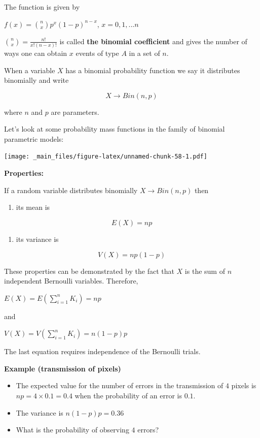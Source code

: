 \documentclass[
]{book}
\providecommand{\tightlist}{%
  \setlength{\itemsep}{0pt}\setlength{\parskip}{0pt}}
\begin{document}
The function is given by

\(f(x)=\binom n x p^x(1-p)^{n-x}\), \(x=0,1,...n\)

\(\binom n x= \frac{n!}{x!(n-x)!}\) is called \textbf{the binomial coefficient} and gives the number of ways one can obtain \(x\) events of type \(A\) in a set of \(n\).

When a variable \(X\) has a binomial probability function we say it distributes binomially and write

\[X\rightarrow Bin(n,p)\]

where \(n\) and \(p\) are parameters.

Let's look at some probability mass functions in the family of binomial parametric models:

\texttt{[image: \_main\_files/figure-latex/unnamed-chunk-58-1.pdf]}

\textbf{Properties:}

If a random variable distributes binomially \(X\rightarrow Bin(n,p)\) then

\begin{enumerate}
\def\labelenumi{\arabic{enumi})}
\tightlist
\item
  its mean is
\end{enumerate}

\[E(X)=np\]

\begin{enumerate}
\def\labelenumi{\arabic{enumi})}
\setcounter{enumi}{1}
\tightlist
\item
  its variance is
\end{enumerate}

\[V(X)=np(1-p)\]

These properties can be demonstrated by the fact that \(X\) is the sum of \(n\) independent Bernoulli variables. Therefore,

\(E(X)=E(\sum_{i=1}^n K_i)=np\)

and

\(V(X)=V(\sum_{i=1}^n K_i)=n(1-p)p\)

The last equation requires independence of the Bernoulli trials.

\textbf{Example (transmission of pixels)}

\begin{itemize}
\item
  The expected value for the number of errors in the transmission of \(4\) pixels is \(np=4\times 0.1=0.4\) when the probability of an error is \(0.1\).
\item
  The variance is \(n(1-p)p=0.36\)
\item
  What is the probability of observing \(4\) errors?
\end{itemize}
\end{document}
